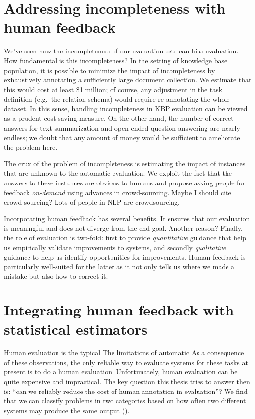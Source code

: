 \section{Addressing incompleteness with human feedback}
We've seen how the incompleteness of our evaluation sets can bias  evaluation.
How fundamental is this incompleteness?
In the setting of knowledge base population, it is possible to minimize the impact of incompleteness by exhaustively annotating a sufficiently large document collection.
We estimate that this would cost at least \$1 million; of course, any adjustment in the task definition (e.g.\ the relation schema) would require re-annotating the whole dataset.
In this sense, handling incompleteness in KBP evaluation can be viewed as a prudent cost-saving measure.
On the other hand, the number of correct answers for text summarization and open-ended question answering are nearly endless; we doubt that any amount of money would be sufficient to ameliorate the problem here.

The crux of the problem of incompleteness is estimating the impact of instances that are unknown to the automatic evaluation.
We exploit the fact that the answers to these instances are obvious to humans and propose asking people for feedback \textit{on-demand} using advances in crowd-sourcing.
\ac{Maybe I should cite crowd-sourcing?} Lots of people in NLP are crowdsourcing.

Incorporating human feedback has several benefits.
It ensures that our evaluation is meaningful and does not diverge from the end goal.
\ac{Another reason?}
Finally, the role of evaluation is two-fold: first to provide \textit{quantitative} guidance that help us empirically validate improvements to systems, and secondly \textit{qualitative} guidance to help us identify opportunities for improvements.
Human feedback is particularly well-suited for the latter as it not only tells us where we made a mistake but also how to correct it.

\section{Integrating human feedback with statistical estimators}
Human evaluation is the typical The limitations of automatic  
As a consequence of these observations, the only reliable way to evaluate systems for these tasks at present is to do a human evaluation.
Unfortunately, human evaluation can be quite expensive and impractical.
The key question this thesis tries to answer then is: ``can we reliably reduce the cost of human annotation in evaluation''?
We find that we can classify problems in two categories based on how often two different systems may produce the same output ().


